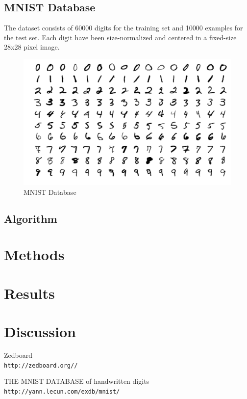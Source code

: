 \documentclass[12pt, a4paper, oneside]{article}
\begin{document}
    	\subsection{MNIST Database}
    		The dataset consists of 60000 digits for the training set and 10000 examples for the test set. Each digit have been size-normalized and centered in a fixed-size 28x28 pixel image. 
    			\begin{figure}[tbh!]
    				\begin{center}
    					\includegraphics[scale=0.25]{MNIST.png}
    					\caption{MNIST Database}
    					\label{fig:MNIST Database}
    				\end{center}
    			\end{figure}
    		
    	\subsection{Algorithm}
    		
    		
    \section{Methods}
    
    \section{Results}
    
    \section{Discussion}
    
    
	\begin{thebibliography}{9}
    	Zedboard
   		\\\texttt{http://zedboard.org//}
    		
	   	THE MNIST DATABASE of handwritten digits
	   	\\\texttt{http://yann.lecun.com/exdb/mnist/}
   \end{thebibliography}
	    
\end{document}
